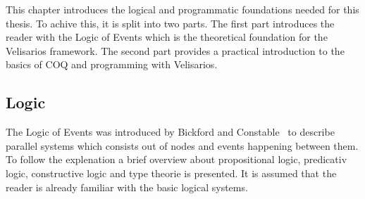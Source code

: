 





This chapter introduces the logical and programmatic foundations needed for this
thesis. To achive this, it is split into two parts. The first part introduces
the reader with the Logic of Events which is the theoretical foundation for the
Velisarios framework. The second part provides a practical introduction to
the basics of COQ and programming with Velisarios.

\subsection{Logic}

The Logic of Events was introduced by Bickford and
Constable~\cite{bickford2003logic} to describe parallel systems which
consists out of nodes and events happening between them. To follow
the explenation a brief overview about propositional logic, predicativ logic,
constructive logic and type theorie is presented. It is assumed that the reader
is already familiar with the basic logical systems.

